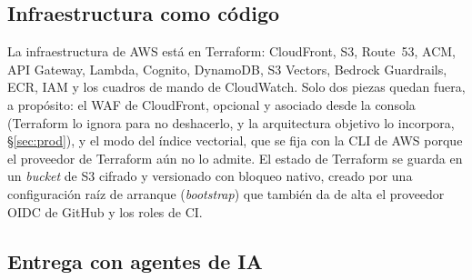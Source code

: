 \subsection{Infraestructura como código}

La infraestructura de AWS está en Terraform: CloudFront, S3, Route~53,
ACM, API Gateway, Lambda, Cognito, DynamoDB, S3 Vectors, Bedrock Guardrails, ECR, IAM
y los cuadros de mando de CloudWatch. Solo dos piezas quedan fuera, a propósito: el WAF de
CloudFront, opcional y asociado desde la consola (Terraform lo ignora para no deshacerlo, y la
arquitectura objetivo lo incorpora, §\ref{sec:prod}), y el modo  del índice
vectorial, que se fija con la CLI de AWS porque el proveedor de Terraform aún no lo admite.
El estado de Terraform se guarda en un \emph{bucket} de S3 cifrado y versionado con bloqueo
nativo, creado por una configuración raíz de arranque (\emph{bootstrap}) que también da de alta el
proveedor OIDC de GitHub y los roles de CI.

\subsection{Entrega con agentes de IA}\label{sec:entrega}

